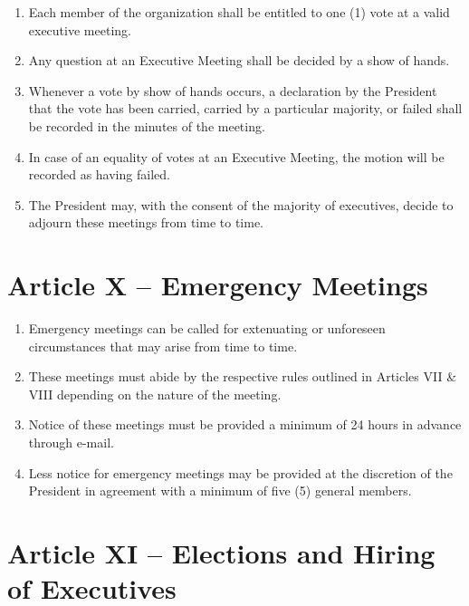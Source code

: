 \documentclass[12pt,a4paper]{article}
\begin{document}
\begin{enumerate}
\item Each member of the organization shall be entitled to one (1) vote at a valid executive meeting.

\item Any question at an Executive Meeting shall be decided by a show of hands.

\item Whenever a vote by show of hands occurs, a declaration by the President that the vote has been carried, carried by a particular majority, or failed shall be recorded in the minutes of the meeting.

\item In case of an equality of votes at an Executive Meeting, the motion will be recorded as having failed.

\item The President may, with the consent of the majority of executives, decide to adjourn these meetings from time to time.
\end{enumerate}

\section*{Article X – Emergency Meetings}

\begin{enumerate}
\item Emergency meetings can be called for extenuating or unforeseen circumstances that may arise from time to time.

\item These meetings must abide by the respective rules outlined in Articles VII \& VIII depending on the nature of the meeting.

\item Notice of these meetings must be provided a minimum of 24 hours in advance through e-mail.

\item Less notice for emergency meetings may be provided at the discretion of the President in agreement with a minimum of five (5) general members.
\end{enumerate}

\section*{Article XI – Elections and Hiring of Executives}
\end{document}

